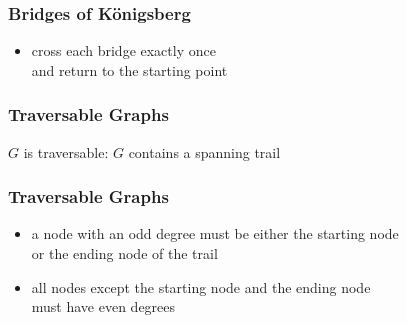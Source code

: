 \documentclass[dvipsnames]{beamer}
\begin{document}
\begin{frame}
  \frametitle{Bridges of Königsberg}

  \begin{center}
  \end{center}

  \begin{itemize}
    \item cross each bridge exactly once\\
      and return to the starting point
  \end{itemize}
\end{frame}

\begin{frame}
  \frametitle{Traversable Graphs}

  \begin{definition}
    $G$ is \alert{traversable}: $G$ contains a spanning trail
  \end{definition}

  \begin{center}
  \end{center}
\end{frame}

\begin{frame}
  \frametitle{Traversable Graphs}

  \begin{itemize}
    \item a node with an odd degree must be either the starting node\\
      or the ending node of the trail
    \item all nodes except the starting node and the ending node\\
      must have even degrees
  \end{itemize}
\end{frame}
\end{document}

